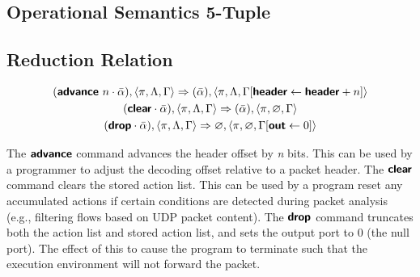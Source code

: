 \subsection{Operational Semantics 5-Tuple}

\subsection{Reduction Relation}
\setlength{\mathindent}{0pt}

\begin{gather*}
  (\bm{\mathsf{{advance}}}~n \cdot \bar\alpha), \langle \pi, \Lambda, \Gamma \rangle
  \Rightarrow
  (\bar\alpha), \langle \pi, \Lambda, \Gamma[\bm{\mathsf{{header}}} \leftarrow \bm{\mathsf{{header}}} + n] \rangle
\\
  (\bm{\mathsf{{clear}}} \cdot \bar\alpha), \langle \pi, \Lambda, \Gamma \rangle
  \Rightarrow
  (\bar\alpha), \langle \pi, \varnothing, \Gamma \rangle
\\
  (\bm{\mathsf{{drop}}} \cdot \bar\alpha), \langle \pi, \Lambda, \Gamma \rangle
  \Rightarrow
  \varnothing, \langle \pi, \varnothing, \Gamma [\bm{\mathsf{{out}}} \leftarrow 0] \rangle
\end{gather*}

The $\bm{\mathsf{{advance}}}$ command advances the header offset by \textit{n} bits.
This can be used by a programmer to adjust the decoding offset relative to a
packet header.
The $\bm{\mathsf{{clear}}}$ command clears the stored action list. This can be used
by a program reset any accumulated actions if certain conditions are detected
during packet analysis (e.g., filtering flows based on UDP packet content).
The $\bm{\mathsf{{drop}}}$ command truncates both the action list and stored action list,
and sets the output port to 0 (the null port). 
The effect of this to cause the program to terminate such that the execution 
environment will not forward the packet.
 


